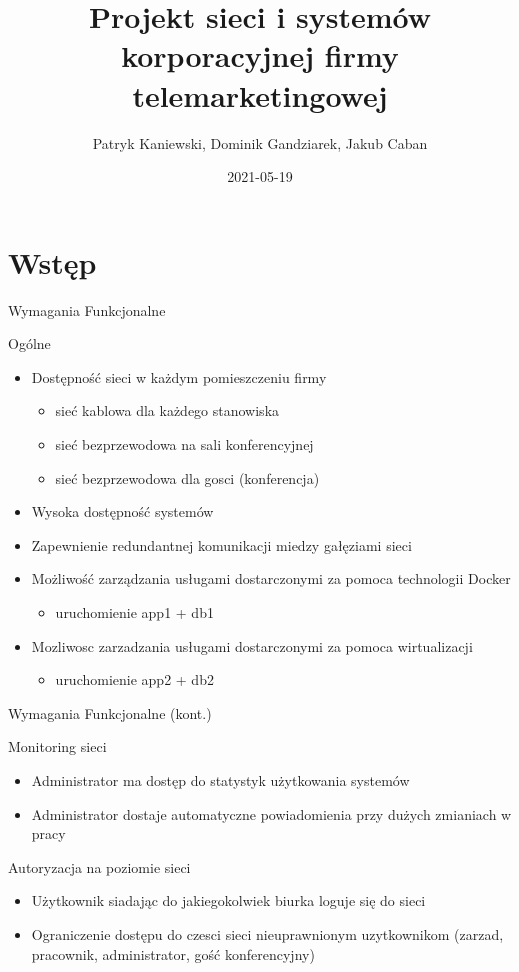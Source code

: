 \documentclass[presentation]{beamer}
\author{Patryk Kaniewski, Dominik Gandziarek, Jakub Caban}
\date{2021-05-19}
\title{Projekt sieci i systemów korporacyjnej firmy telemarketingowej}
\begin{document}
\maketitle

\section{Wstęp}
\label{sec:org7322274}
\begin{frame}[label={sec:orgcc87bc0}]{Wymagania Funkcjonalne}
\begin{block}{Ogólne}
\begin{itemize}
\item Dostępność sieci w każdym pomieszczeniu firmy
\begin{itemize}
\item sieć kablowa dla każdego stanowiska
\item sieć bezprzewodowa na sali konferencyjnej
\item sieć bezprzewodowa dla gosci (konferencja)
\end{itemize}
\item Wysoka dostępność systemów
\item Zapewnienie redundantnej komunikacji miedzy gałęziami sieci
\item Możliwość zarządzania usługami dostarczonymi za pomoca technologii Docker
\begin{itemize}
\item uruchomienie app1 + db1
\end{itemize}
\item Mozliwosc zarzadzania usługami dostarczonymi za pomoca wirtualizacji
\begin{itemize}
\item uruchomienie app2 + db2
\end{itemize}
\end{itemize}
\end{block}
\end{frame}
\begin{frame}[label={sec:orgc167613}]{Wymagania Funkcjonalne (kont.)}
\begin{block}{Monitoring sieci}
\begin{itemize}
\item Administrator ma dostęp do statystyk użytkowania systemów
\item Administrator dostaje automatyczne powiadomienia przy dużych zmianiach w pracy
\end{itemize}
\end{block}
\begin{block}{Autoryzacja na poziomie sieci}
\begin{itemize}
\item Użytkownik siadając do jakiegokolwiek biurka loguje się do sieci
\item Ograniczenie dostępu do czesci sieci nieuprawnionym uzytkownikom (zarzad, pracownik, administrator, gość konferencyjny)
\end{itemize}
\end{block}
\end{frame}
\end{document}
